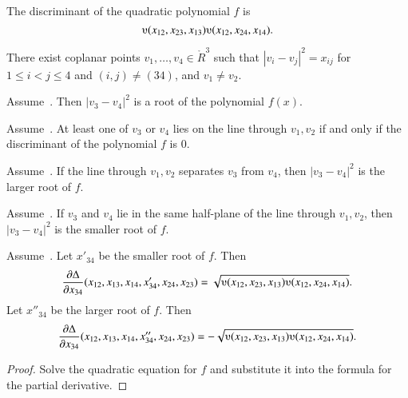 \begin{lemma}
The discriminant of the quadratic polynomial $f$ is
	$$
	\ups(x_{12},x_{23},x_{13}) \ups(x_{12},x_{24},x_{14}).
	$$
\end{lemma}



\begin{assumption}
There exist
coplanar points $v_1,\ldots,v_4\in\ring{R}^3$ such that $|v_i-v_j|^2 = x_{ij}$ for $1\le i < j \le 4$ and $(i,j)\ne (34)$, and $v_1\ne v_2$.
\end{assumption}


\begin{lemma}
Assume~.
Then $|v_3-v_4|^2$ is a root of the polynomial $f(x)$. 
\end{lemma}

\begin{lemma}
Assume~.
At least one of $v_3$ or $v_4$ lies on the line through $v_1,v_2$ if and only if
the discriminant of the polynomial $f$ is $0$.
\end{lemma}

\begin{lemma} 
Assume~.
If the line through $v_1,v_2$ separates
$v_3$ from $v_4$, then $|v_3-v_4|^2$ is the larger root of $f$.
\end{lemma}

\begin{lemma}
Assume~.
If $v_3$ and $v_4$ lie in the same half-plane of the line through $v_1,v_2$, then 
 $|v_3-v_4|^2$ is the smaller root of $f$.
\end{lemma}


\begin{lemma}
Assume~.  Let $x'_{34}$ be the smaller root
of $f$.  Then
  $$\frac{\partial\Delta}{\partial x_{34}} (x_{12},x_{13},x_{14},
   x'_{34},x_{24},x_{23}) = 
    \sqrt{\ups(x_{12},x_{23},x_{13}) \ups(x_{12},x_{24},x_{14})}.
  $$
Let $x''_{34}$ be the larger root
of $f$.  Then
  $$\frac{\partial\Delta}{\partial x_{34}} (x_{12},x_{13},x_{14},
   x''_{34},x_{24},x_{23}) = 
    -\sqrt{\ups(x_{12},x_{23},x_{13}) \ups(x_{12},x_{24},x_{14})}.
  $$
\end{lemma}

\begin{proof} Solve the quadratic equation for $f$ and substitute
it into the formula for the partial derivative.
\end{proof}


